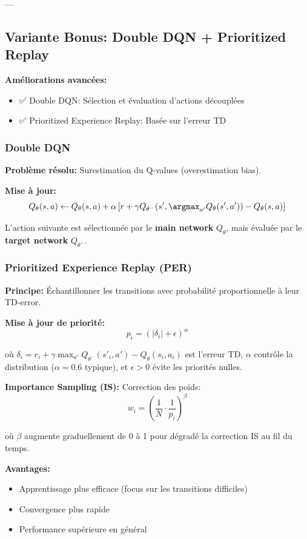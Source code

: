 ---

\subsection{Variante Bonus: Double DQN + Prioritized Replay}

\textbf{Améliorations avancées:}
\begin{itemize}
    \item ✅ Double DQN: Sélection et évaluation d'actions découplées
    \item ✅ Prioritized Experience Replay: Basée sur l'erreur TD
\end{itemize}

\subsubsection{Double DQN}

\textbf{Problème résolu:} Surestimation du Q-values (overestimation bias).

\textbf{Mise à jour:}
\[
Q_\theta(s,a) \leftarrow Q_\theta(s,a) + \alpha \left[ r + \gamma Q_{\theta^-}(s', \argmax_{a'} Q_\theta(s', a')) - Q_\theta(s,a) \right]
\]

L'action suivante est sélectionnée par le \textbf{main network} $Q_\theta$,
mais évaluée par le \textbf{target network} $Q_{\theta^-}$.

\subsubsection{Prioritized Experience Replay (PER)}

\textbf{Principe:} Échantillonner les transitions avec probabilité proportionnelle à leur TD-error.

\textbf{Mise à jour de priorité:}
\[
p_i = (|\delta_i| + \epsilon)^\alpha
\]

où $\delta_i = r_i + \gamma \max_{a'} Q_{\theta^-}(s'_i, a') - Q_\theta(s_i, a_i)$ est l'erreur TD,
$\alpha$ contrôle la distribution ($ \alpha=0.6$ typique), et $\epsilon > 0$ évite les priorités nulles.

\textbf{Importance Sampling (IS):} Correction des poids:
\[
w_i = \left(\frac{1}{N} \cdot \frac{1}{p_i}\right)^\beta
\]

où $\beta$ augmente graduellement de 0 à 1 pour dégradé la correction IS au fil du temps.

\textbf{Avantages:}
\begin{itemize}
    \item Apprentissage plus efficace (focus sur les transitions difficiles)
    \item Convergence plus rapide
    \item Performance supérieure en général
\end{itemize}

